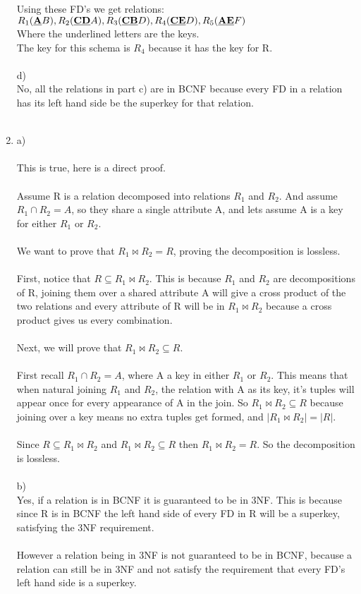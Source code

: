 \documentclass{article}
\begin{document}
\begin{enumerate}
    Using these FD's we get relations:
    $R_1(\textbf{\underline{A}}B), R_2(\textbf{\underline{CD}}A), R_3(\textbf{\underline{CB}}D), R_4(\textbf{\underline{CE}}D), R_5(\textbf{\underline{AE}}F)  $
    \\ Where the underlined letters are the keys. 
    \\ The key for this schema is $R_4$ because it has the key for R.  
    \\ \\
    d) \\
    No, all the relations in part c) are in BCNF because every FD in a relation has its left hand side be the superkey for that relation.
    \\
    \\
    \item %
   	a)\\\\
    This is true, here is a direct proof.
    \\ \\ 
    Assume R is a relation decomposed into relations $R_1$ and $R_2$. And assume $R_1 \cap R_2 = A$, so they share a single attribute A, and lets assume A is a key for either $R_1$ or $R_2$.\\
    \\
    We want to prove that $R_1 \bowtie R_2 = R$, proving the decomposition is lossless. 
    \\
    \\ 
    First, notice that $R \subseteq R_1 \bowtie R_2$. This is because $R_1$ and $R_2$ are decompositions of R, joining them over a shared attribute A will give a cross product of the two relations and every attribute of R will be in $R_1 \bowtie R_2$ because a cross product gives us every combination.
    \\
    \\
    Next, we will prove that $R_1 \bowtie R_2 \subseteq R$. 
    \\ \\
    First recall $R_1 \cap R_2 = A$, where A a key in either $R_1$ or $R_2$.
    This means that when natural joining $R_1$ and $R_2$, the relation with A as its key, it's tuples will appear once for every appearance of A in the join. So $R_1 \bowtie R_2 \subseteq R$ because joining over a key means no extra tuples get formed, and $|R_1 \bowtie R_2| = |R|$. 
    \\
    \\ 
    Since $R \subseteq R_1 \bowtie R_2$ and $R_1 \bowtie R_2 \subseteq R$ then $R_1 \bowtie R_2 = R$. So the decomposition is lossless.
    \\
    \\
    b)\\
    Yes, if a relation is in BCNF it is guaranteed to be in 3NF. This is because since R is in BCNF the left hand side of every FD in R will be a superkey, satisfying the 3NF requirement.
    \\ \\
    However a relation being in 3NF is not guaranteed to be in BCNF, because a relation can still be in 3NF and not satisfy the requirement that every FD's left hand side is a superkey. 
    

\end{enumerate}
\end{document}

